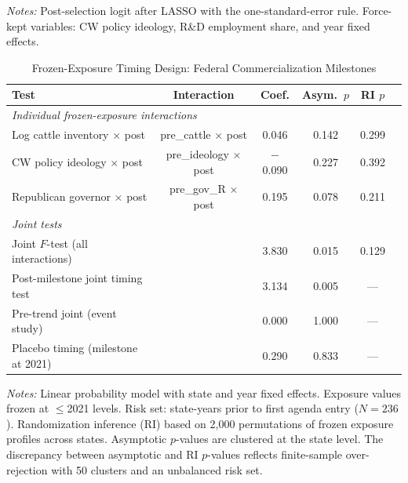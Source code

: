 \documentclass[12pt]{article}
\begin{document}
\begin{appendices}
\begin{table}[htbp]
\centering
\begin{threeparttable}
\caption{Post-Least Absolute Shrinkage and Selection Operator (LASSO) Logit: One-Standard-Error Rule (Stage 1)}
\label{tab:lasso}
\scriptsize

\begin{tablenotes}[flushleft]
\footnotesize
\item \textit{Notes:} Post-selection logit after LASSO with the one-standard-error rule.  Force-kept variables: CW policy ideology, R\&D employment share, and year fixed effects.
\end{tablenotes}
\end{threeparttable}
\end{table}

\begin{table}[htbp]
\centering
\begin{threeparttable}
\caption{Frozen-Exposure Timing Design: Federal Commercialization Milestones}
\label{tab:did}
\begin{tabular}{lccccc}
\toprule
Test & Interaction & Coef. & Asym.\ $p$ & RI $p$ \\
\midrule
\multicolumn{5}{l}{\textit{Individual frozen-exposure interactions}} \\
\quad Log cattle inventory $\times$ post & pre\_cattle $\times$ post & 0.046 & 0.142 & 0.299 \\
\quad CW policy ideology $\times$ post & pre\_ideology $\times$ post & $-$0.090 & 0.227 & 0.392 \\
\quad Republican governor $\times$ post & pre\_gov\_R $\times$ post & 0.195 & 0.078 & 0.211 \\
\midrule
\multicolumn{5}{l}{\textit{Joint tests}} \\
\quad Joint $F$-test (all interactions) & & 3.830 & 0.015 & 0.129 \\
\quad Post-milestone joint timing test & & 3.134 & 0.005 & --- \\
\quad Pre-trend joint (event study) & & 0.000 & 1.000 & --- \\
\quad Placebo timing (milestone at 2021) & & 0.290 & 0.833 & --- \\
\bottomrule
\end{tabular}
\begin{tablenotes}[flushleft]
\footnotesize
\item \textit{Notes:} Linear probability model with state and year fixed effects.  Exposure values frozen at $\leq$2021 levels.  Risk set: state-years prior to first agenda entry ($N = 236$).  Randomization inference (RI) based on 2,000 permutations of frozen exposure profiles across states.  Asymptotic $p$-values are clustered at the state level.  The discrepancy between asymptotic and RI $p$-values reflects finite-sample over-rejection with 50 clusters and an unbalanced risk set.
\end{tablenotes}
\end{threeparttable}
\end{table}


\end{appendices}
\end{document}

